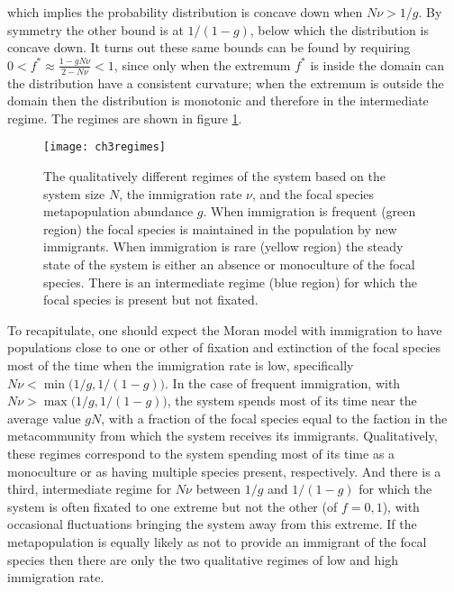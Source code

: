 which implies the probability distribution is concave down when $N\nu > 1/g$. %
By symmetry the other bound is at $1/(1-g)$, below which the distribution is concave down. 
It turns out these same bounds can be found by requiring $0<f^*\approx\frac{1-g N\nu}{2-N\nu}<1$, since only when the extremum $f^*$ is inside the domain can the distribution have a consistent curvature; when the extremum is outside the domain then the distribution is monotonic and therefore in the intermediate regime. 
The regimes are shown in figure \ref{biodiversity-regimes}. 

\begin{figure}[ht]
	\centering
	\texttt{[image: ch3regimes]}
	\caption{The qualitatively different regimes of the system based on the system size $N$, the immigration rate $\nu$, and the focal species metapopulation abundance $g$. When immigration is frequent (green region) the focal species is maintained in the population by new immigrants. When immigration is rare (yellow region) the steady state of the system is either an absence or monoculture of the focal species. There is an intermediate regime (blue region) for which the focal species is present but not fixated. } \label{biodiversity-regimes}
\end{figure}

%
To recapitulate, one should expect the Moran model with immigration to have populations close to one or other of fixation and extinction of the focal species most of the time when the immigration rate is low, specifically $N\nu < \min\big(1/g,1/(1-g)\big)$. 
In the case of frequent immigration, with $N\nu > \max\big(1/g,1/(1-g)\big)$, the system spends most of its time near the average value $gN$, with a fraction of the focal species equal to the faction in the metacommunity from which the system receives its immigrants. 
Qualitatively, these regimes correspond to the system spending most of its time as a monoculture or as having multiple species present, respectively. 
And there is a third, intermediate regime for $N\nu$ between $1/g$ and $1/(1-g)$ for which the system is often fixated to one extreme but not the other (of $f=0,1$), with occasional fluctuations bringing the system away from this extreme. 
If the metapopulation is equally likely as not to provide an immigrant of the focal species then there are only the two qualitative regimes of low and high immigration rate. %

